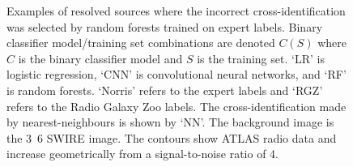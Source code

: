\documentclass[fleqn,usenatbib,usedcolumn]{mnras}
\begin{document}
\begin{figure}
        \caption{\label{fig:examples} Examples of resolved sources where the incorrect cross-identification was selected by random forests trained on expert labels. Binary classifier model/training set combinations are denoted $C(S)$ where $C$ is the binary classifier model and $S$ is the training set. `LR' is logistic regression, `CNN' is convolutional neural networks, and `RF' is random forests. `Norris' refers to the expert labels and `RGZ' refers to the Radio Galaxy Zoo labels. The cross-identification made by nearest-neighbours is shown by `NN'. The background image is the \unit{3.6}{\micro\meter} SWIRE image. The contours show ATLAS radio data and increase geometrically from a signal-to-noise ratio of 4.}
    \end{figure}
  
\end{document}
